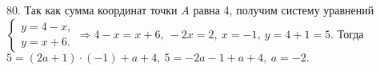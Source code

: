 80. Так как сумма координат точки $A$ равна 4, получим систему уравнений $\begin{cases} y=4-x,\\ y=x+6.\end{cases}\Rightarrow 4-x=x+6,\ -2x=2,\ x=-1,\ y=4+1=5.$ Тогда $5=(2a+1)\cdot(-1)+a+4,\ 5=-2a-1+a+4,\ a=-2.$\\

